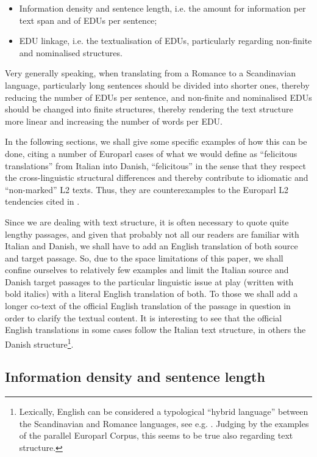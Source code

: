 \documentclass[output=paper]{LSP/langsci}
\begin{document}
\begin{itemize}
\item
Information density and sentence length, i.e. the amount for information per text span and of EDUs per sentence;
\item
EDU linkage, i.e. the textualisation of EDUs, particularly regarding non-finite and nominalised structures.
\end{itemize}

Very generally speaking, when translating from a Romance to a Scandinavian language, particularly long sentences should be divided into shorter ones, thereby reducing the number of EDUs per sentence, and non-finite and nominalised EDUs should be changed into finite structures, thereby rendering the text structure more linear and increasing the number of words per EDU.

In the following sections, we shall give some specific examples of how this can be done, citing a number of Europarl cases of what we would define as ``felicitous translations'' from Italian into Danish, ``felicitous'' in the sense that they respect the cross-linguistic structural differences and thereby contribute to idiomatic and ``non-marked'' L2 texts. Thus, they are counterexamples to the Europarl L2 tendencies cited in .

Since we are dealing with text structure, it is often necessary to quote quite lengthy passages, and given that probably not all our readers are familiar with Italian and Danish, we shall have to add an English translation of both source and target passage. So, due to the space limitations of this paper, we shall confine ourselves to relatively few examples and limit the Italian source and Danish target passages to the particular linguistic issue at play (written with bold italics) with a literal English translation of both. To those we shall add a longer co-text of the official English translation of the passage in question in order to clarify the textual content. It is interesting to see that the official English translations in some cases follow the Italian text structure, in others the Danish structure\footnote{Lexically, English can be considered a typological ``hybrid language'' between the Scandinavian and Romance languages, see e.g. \citet{Baron2005}. Judging by the examples of the parallel Europarl Corpus, this seems to be true also regarding text structure.}.

\subsection{Information density and sentence length}\label{sec:korzen:4.1}
\end{document}
